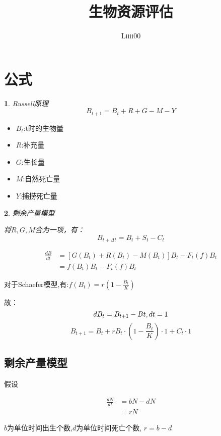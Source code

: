 \documentclass[12pt, a4paper, oneside]{ctexart}
\title{生物资源评估}
\author{Liiii00}
\newtheorem{theorem}{}
\begin{document}
\maketitle

\newpage
\section{公式}

\begin{theorem}Russell原理
    $$B_{t+1}=B_t+R+G-M-Y$$ 
\end{theorem}


\begin{itemize}
    \item $B_t$:t时的生物量
    \item $R$:补充量
    \item $G$:生长量
    \item $M$:自然死亡量
    \item $Y$:捕捞死亡量
\end{itemize}

\begin{theorem}剩余产量模型

将$R,G,M$合为一项，有：
$$B_{t+\Delta t} = B_t+S_t-C_t$$

\end{theorem}

$$
\begin{aligned}
    {\frac{dB}{dt}} & = [G(B_t) + R(B_t) - M(B_t)]B_t-F_t(f)B_t \\
                    & = f(B_t)B_t-F_t(f)B_t
\end{aligned}
$$

对于Schaefer模型,有:$f\left(B_t\right) = r\left(1-\frac{B_t}{K}\right)$

故：
$$dB_t=B_{t+1} - B{t},\space dt=1$$
$$B_{t+1} = B_t + rB_t\cdot(1-\frac{B_t}{K})\cdot1+C_t\cdot1$$


\subsection{剩余产量模型}

假设

$$
\begin{aligned}
    {\frac{dN}{dt}} & = bN-dN \text{} \\
    &=rN
\end{aligned}
$$
\begin{center}
    $b$为单位时间出生个数,\quad $d$为单位时间死亡个数, \quad$r=b-d$
\end{center} 
\end{document}

